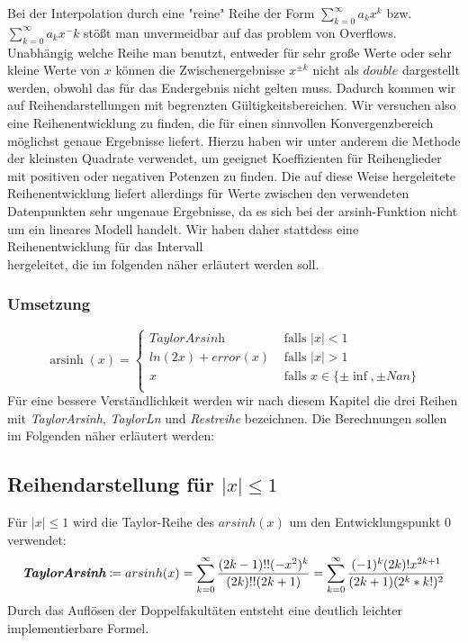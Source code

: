 \documentclass[course=erap] {aspdoc}
\begin{document}
     Bei der Interpolation durch eine "reine" Reihe der Form $\sum_{k=0}^{\infty} a_k x^k$ bzw. $\sum_{k=0}^{\infty} a_k x^-k$ stößt man unvermeidbar auf das problem von Overflows.
     Unabhängig welche Reihe man benutzt, entweder für sehr große Werte oder sehr kleine Werte von $x$ können die Zwischenergebnisse $x^{\pm k}$ nicht als $double$ dargestellt werden, obwohl das für das Endergebnis nicht gelten muss.
     Dadurch kommen wir auf Reihendarstellungen mit begrenzten Gültigkeitsbereichen.
     Wir versuchen also eine Reihenentwicklung zu finden, die für einen sinnvollen Konvergenzbereich möglichst genaue Ergebnisse liefert. Hierzu haben wir unter anderem die Methode der kleinsten Quadrate verwendet, um geeignet Koeffizienten für Reihenglieder mit positiven oder negativen Potenzen zu finden. Die auf diese Weise hergeleitete Reihenentwicklung liefert allerdings für Werte zwischen den verwendeten Datenpunkten sehr ungenaue Ergebnisse, da es sich bei der arsinh-Funktion nicht um ein lineares Modell handelt. Wir haben daher stattdess eine Reihenentwicklung für das Intervall $$$$ hergeleitet, die im folgenden näher erläutert werden soll.
     \subsubsection{Umsetzung}
     
     \[ \operatorname{arsinh}(x) =
     \begin{cases}
        \textit{TaylorArsinh}     & \text{ falls } |x| < 1 \\
        ln(2x) + error(x)  & \text{ falls } |x| >1 \\
        x     & \text{ falls } x \in \{\pm\inf, \pm Nan\}\\
    \end{cases}\]
    Für eine bessere Verständlichkeit werden wir nach diesem Kapitel die drei Reihen mit \textit{TaylorArsinh}, \textit{TaylorLn} und \textit{Restreihe} bezeichnen.
    Die Berechnungen sollen im Folgenden näher erläutert werden:
    
    \subsection{Reihendarstellung für $|x|\leq 1$}
     Für $|x| \leq 1$ wird die Taylor-Reihe des $arsinh(x)$ um den Entwicklungspunkt 0 verwendet:
     \[
        \textit{\textbf{TaylorArsinh}}\coloneqq arsinh(x) = \sum_{k = 0}^{\infty} \frac{(2k-1)!!(-x^2)^k}{(2k)!!(2k + 1)}
         = \sum_{k = 0}^{\infty} \frac{(-1)^k(2k)!x^{2k + 1}}{(2k + 1)(2^k*k!)^2}
     \]
     Durch das Auflösen der Doppelfakultäten entsteht eine deutlich leichter implementierbare Formel.
\end{document}

